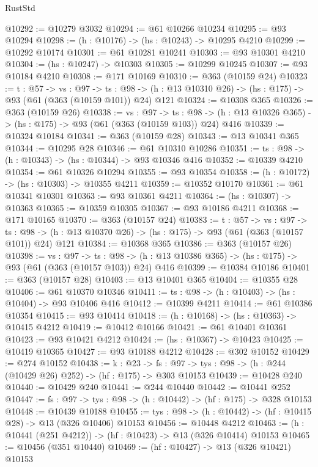 \begin{lexlean}{RustStd}
\begin{coremodule}
@10292 := @10279 @3032
@10294 := @61 @10266 @10234
@10295 := @93 @10294
@10298 := (h : @10176) -> (hs : @10243) -> @10295 @4210
@10299 := @10292 @10174
@10301 := @61 @10281 @10241
@10303 := @93 @10301 @4210
@10304 := (hs : @10247) -> @10303
@10305 := @10299 @10245
@10307 := @93 @10184 @4210
@10308 := @171 @10169
@10310 := @363 (@10159 @24)
@10323 := {t : @57} ->
  {vs : @97} ->
  {ts : @98} -> (h : @13 @10310 @26) -> (hs : @175) -> @93 (@61 (@363 (@10159 @101)) @24) @121
@10324 := @10308 @365
@10326 := @363 (@10159 @26)
@10338 := {vs : @97} ->
  {ts : @98} -> (h : @13 @10326 @365) -> (hs : @175) -> @93 (@61 (@363 (@10159 @103)) @24) @416
@10339 := @10324 @10184
@10341 := @363 (@10159 @28)
@10343 := @13 @10341 @365
@10344 := @10295 @28
@10346 := @61 @10310 @10286
@10351 := {ts : @98} -> (h : @10343) -> (hs : @10344) -> @93 @10346 @416
@10352 := @10339 @4210
@10354 := @61 @10326 @10294
@10355 := @93 @10354
@10358 := (h : @10172) -> (hs : @10303) -> @10355 @4211
@10359 := @10352 @10170
@10361 := @61 @10341 @10301
@10363 := @93 @10361 @4211
@10364 := (hs : @10307) -> @10363
@10365 := @10359 @10305
@10367 := @93 @10186 @4211
@10368 := @171 @10165
@10370 := @363 (@10157 @24)
@10383 := {t : @57} ->
  {vs : @97} ->
  {ts : @98} -> (h : @13 @10370 @26) -> (hs : @175) -> @93 (@61 (@363 (@10157 @101)) @24) @121
@10384 := @10368 @365
@10386 := @363 (@10157 @26)
@10398 := {vs : @97} ->
  {ts : @98} -> (h : @13 @10386 @365) -> (hs : @175) -> @93 (@61 (@363 (@10157 @103)) @24) @416
@10399 := @10384 @10186
@10401 := @363 (@10157 @28)
@10403 := @13 @10401 @365
@10404 := @10355 @28
@10406 := @61 @10370 @10346
@10411 := {ts : @98} -> (h : @10403) -> (hs : @10404) -> @93 @10406 @416
@10412 := @10399 @4211
@10414 := @61 @10386 @10354
@10415 := @93 @10414
@10418 := (h : @10168) -> (hs : @10363) -> @10415 @4212
@10419 := @10412 @10166
@10421 := @61 @10401 @10361
@10423 := @93 @10421 @4212
@10424 := (hs : @10367) -> @10423
@10425 := @10419 @10365
@10427 := @93 @10188 @4212
@10428 := @302 @10152
@10429 := @274 @10152
@10438 := {k : @23} ->
  {fs : @97} -> {tys : @98} -> (h : @244 (@10429 @26) @252) -> (hf : @175) -> @303 @10153
@10439 := @10428 @240
@10440 := @10429 @240
@10441 := @244 @10440
@10442 := @10441 @252
@10447 := {fs : @97} -> {tys : @98} -> (h : @10442) -> (hf : @175) -> @328 @10153
@10448 := @10439 @10188
@10455 := {tys : @98} -> (h : @10442) -> (hf : @10415 @28) -> @13 (@326 @10406) @10153
@10456 := @10448 @4212
@10463 := (h : @10441 (@251 @4212)) -> (hf : @10423) -> @13 (@326 @10414) @10153
@10465 := @10456 (@351 @10440)
@10469 := (hf : @10427) -> @13 (@326 @10421) @10153

\end{coremodule}
\end{lexlean}
